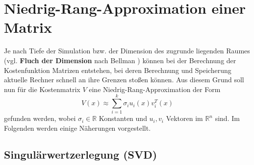 \documentclass[12pt,a4paper,twoside]{article}
\begin{document}
\section{Niedrig-Rang-Approximation einer Matrix}
	Je nach Tiefe der Simulation bzw. der Dimension des zugrunde liegenden Raumes (vgl. \textbf{Fluch der Dimension} 
	nach Bellman \citep{Bellman1961}) können bei der Berechnung der Kostenfunktion Matrizen entstehen, bei deren Berechnung und Speicherung aktuelle Rechner schnell an ihre Grenzen stoßen können. Aus diesem Grund soll nun für die Kostenmatrix $V$ eine Niedrig-Rang-Approximation der Form
	\begin{equation}
		\label{eq:approx}
		V(x)\approx \sum_{i=1}^k\sigma_i u_i(x) v_i^T(x)
	\end{equation}
	gefunden werden, wobei $\sigma_i\in \mathds{R}$ Konstanten und $u_i, v_i$ Vektoren im $\mathds{R}^n$ sind. Im Folgenden werden einige Näherungen vorgestellt.
	\subsection{Singulärwertzerlegung (SVD)}
		\label{sec:SVD}
\end{document}

